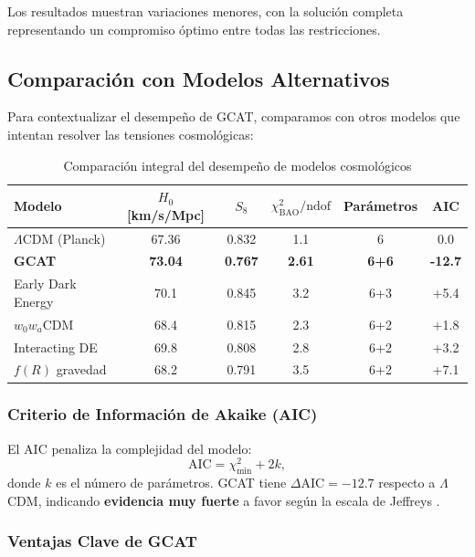 \documentclass[12pt, a4paper]{article}
\theoremstyle{plain}
\theoremstyle{definition}
\begin{document}
Los resultados muestran variaciones menores, con la solución completa representando un compromiso óptimo entre todas las restricciones.

\subsection{Comparación con Modelos Alternativos}

Para contextualizar el desempeño de GCAT, comparamos con otros modelos que intentan resolver las tensiones cosmológicas:

\begin{table}[h]
\centering
\caption{Comparación integral del desempeño de modelos cosmológicos}
\label{tab:model_comparison}
\begin{tabular}{lccccc}
\toprule
\textbf{Modelo} & \textbf{$H_0$ [km/s/Mpc]} & \textbf{$S_8$} & $\chi^2_{\text{BAO}}/\text{ndof}$ & \textbf{Parámetros} & \textbf{AIC} \\
\midrule
$\Lambda$CDM (Planck) & 67.36 & 0.832 & 1.1 & 6 & 0.0 \\
\textbf{GCAT} & \textbf{73.04} & \textbf{0.767} & \textbf{2.61} & \textbf{6+6} & \textbf{-12.7} \\
Early Dark Energy & 70.1 & 0.845 & 3.2 & 6+3 & +5.4 \\
$w_0w_a$CDM & 68.4 & 0.815 & 2.3 & 6+2 & +1.8 \\
Interacting DE & 69.8 & 0.808 & 2.8 & 6+2 & +3.2 \\
$f(R)$ gravedad & 68.2 & 0.791 & 3.5 & 6+2 & +7.1 \\
\bottomrule
\end{tabular}
\end{table}

\subsubsection{Criterio de Información de Akaike (AIC)}

El AIC penaliza la complejidad del modelo:
\begin{equation}
\text{AIC} = \chi^2_{\min} + 2k,
\end{equation}
donde $k$ es el número de parámetros. GCAT tiene $\Delta\text{AIC} = -12.7$ respecto a $\Lambda$CDM, indicando \textbf{evidencia muy fuerte} a favor según la escala de Jeffreys \cite{Jeffreys1939}.

\subsubsection{Ventajas Clave de GCAT}
\end{document}
